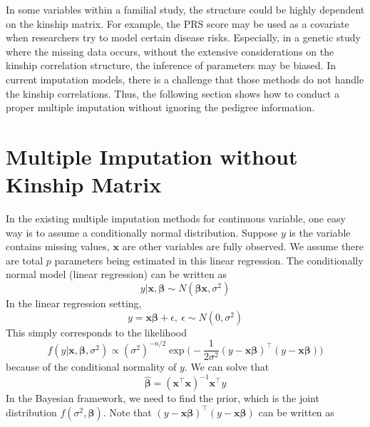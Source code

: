 In some variables within a familial study, the structure could be highly dependent on the kinship matrix. 
For example, the PRS score may be used as a covariate when researchers try to model certain disease risks. 
Especially, in a genetic study where the missing data occurs, without the extensive considerations on the kinship correlation structure, the inference of parameters may be biased. 
In current imputation models, there is a challenge that those methods do not handle the kinship correlations. 
Thus, the following section shows how to conduct a proper multiple imputation without ignoring the pedigree information. 

\section{Multiple Imputation without Kinship Matrix}
\raggedbottom
In the existing multiple imputation methods for continuous variable, one easy way is to assume a conditionally normal distribution. 
Suppose $y$ is the variable contains missing values, $\mathbf{x}$ are other variables are fully observed. 
We assume there are total $p$ parameters being estimated in this linear regression. 
The conditionally normal model (linear regression) can be written as 
\begin{equation} 
    y|\mathbf{x},\boldsymbol{\beta}\sim N(\boldsymbol{\beta}\mathbf{x}, \sigma^2)
\end{equation}
In the linear regression setting, 
\begin{equation} 
    y=\mathbf{x}\boldsymbol{\beta}+\epsilon,~ \epsilon\sim N(0, \sigma^2)
\end{equation}
This simply corresponds to the likelihood 
\begin{equation}\label{eq:bayeslinearnormal}
    f(y|\mathbf{x}, \boldsymbol{\beta}, \sigma^2)\propto (\sigma^2)^{-n/2}\exp \Big (-\frac{1}{2\sigma^2} (y-\mathbf{x}\boldsymbol{\beta})^{\top}(y-\mathbf{x}\boldsymbol{\beta})\Big )
\end{equation}
because of the conditional normality of $y$. 
We can solve that 
\begin{equation} 
    \hat{\boldsymbol{\beta}}=(\mathbf{x}^{\top}\mathbf{x})^{-1}\mathbf{x}^{\top}y
\end{equation}
In the Bayesian framework, we need to find the prior, which is the joint distribution $f(\sigma^2,\boldsymbol{\beta})$. 
Note that $(y-\mathbf{x}\boldsymbol{\beta})^{\top}(y-\mathbf{x}\boldsymbol{\beta})$ can be written as 

